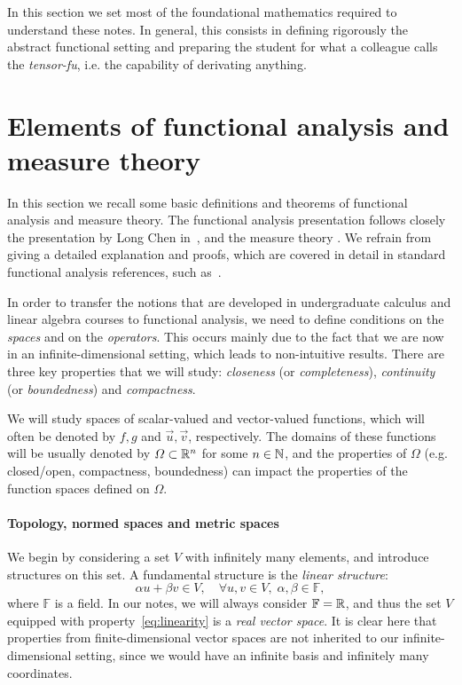 In this section we set most of the foundational mathematics required to understand these notes. In general, this consists in defining rigorously the abstract functional setting and preparing the student for what a colleague calls the \emph{tensor-fu}, i.e. the capability of derivating anything.

\section{Elements of functional analysis and measure theory}\label{sec:elements-functional-analysis}
In this section we recall some basic definitions and theorems of functional analysis and measure theory. The functional analysis presentation follows closely the presentation by Long Chen in~\cite{chen2024infSup}, and the measure theory . We refrain from giving a detailed explanation and proofs, which are covered in detail in standard functional analysis references, such as~\cite{BrezisFA}.

In order to transfer the notions that are developed in undergraduate calculus and linear algebra courses to functional analysis, we need to define conditions on the \emph{spaces} and on the \emph{operators}. This occurs mainly due to the fact that we are now in an infinite-dimensional setting, which leads to non-intuitive results. There are three key properties that we will study: \emph{closeness} (or \emph{completeness}), \emph{continuity} (or \emph{boundedness}) and \emph{compactness}.

We will study spaces of scalar-valued and vector-valued functions, which will often be denoted by $f, g$ and $\vec u, \vec v$, respectively. The domains of these functions will be usually denoted by $\Omega\subset\mathbb{R}^n$ for some $n\in\mathbb{N}$, and the properties of $\Omega$ (e.g. closed/open, compactness, boundedness) can impact the properties of the function spaces defined on $\Omega$.

\paragraph{Topology, normed spaces and metric spaces}
We begin by considering a set $V$ with infinitely many elements, and introduce structures on this set. A fundamental structure is the \emph{linear structure}:
\begin{equation}\label{eq:linearity}
    \alpha u + \beta v \in V,\quad \forall u,v\in V, \; \alpha, \beta\in \mathbb{F},
\end{equation}
where $\mathbb{F}$ is a field. In our notes, we will always consider $\mathbb{F}=\mathbb{R}$, and thus the set $V$ equipped with property~\eqref{eq:linearity} is a \emph{real vector space}. It is clear here that properties from finite-dimensional vector spaces are not inherited to our infinite-dimensional setting, since we would have an infinite basis and infinitely many coordinates. 

